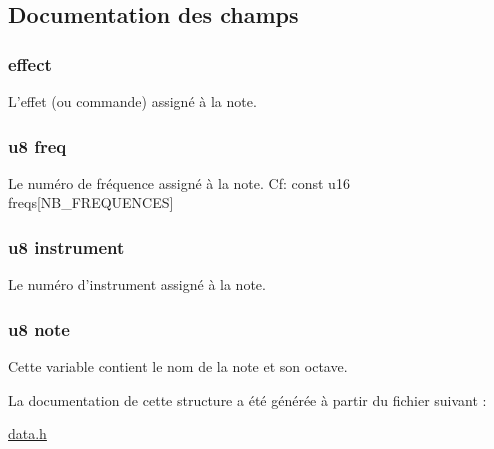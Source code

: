 \subsection{Documentation des champs}
\hypertarget{struct_n_o_t_e_a741151ee9cb5c0bde79f6dfee55f951a}{
\subsubsection[{effect}]{ {\bf effect}}}
\label{struct_n_o_t_e_a741151ee9cb5c0bde79f6dfee55f951a}
L'effet (ou commande) assigné à la note. \hypertarget{struct_n_o_t_e_aadfadeeef2295627c3f6e78dfd46cf73}{
\subsubsection[{freq}]{\setlength{\rightskip}{0pt plus 5cm}u8 {\bf freq}}}
\label{struct_n_o_t_e_aadfadeeef2295627c3f6e78dfd46cf73}
Le numéro de fréquence assigné à la note. Cf: const u16 freqs\mbox{[}NB\_\-FREQUENCES\mbox{]} \hypertarget{struct_n_o_t_e_a1c6a03f41107c548d1ecb7435d3541e0}{
\subsubsection[{instrument}]{\setlength{\rightskip}{0pt plus 5cm}u8 {\bf instrument}}}
\label{struct_n_o_t_e_a1c6a03f41107c548d1ecb7435d3541e0}
Le numéro d'instrument assigné à la note. \hypertarget{struct_n_o_t_e_ae312e84740a2f94fd423ce02bac7c81d}{
\subsubsection[{note}]{\setlength{\rightskip}{0pt plus 5cm}u8 {\bf note}}}
\label{struct_n_o_t_e_ae312e84740a2f94fd423ce02bac7c81d}
Cette variable contient le nom de la note et son octave. 

La documentation de cette structure a été générée à partir du fichier suivant :\begin{DoxyCompactItemize}
\item 
\hyperlink{data_8h}{data.h}\end{DoxyCompactItemize}
